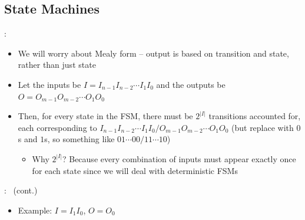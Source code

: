 \documentclass{../slides}
\begin{document}
\subsection{State Machines}
\begin{frame}{\secname: \subsecname}
    \begin{itemize}
        \item We will worry about Mealy form -- output is based on transition and state, rather than just state
        \item Let the inputs be $I = I_{n-1}I_{n-2}\cdots I_1I_0$ and the outputs be $O = O_{m-1}O_{m-2}\cdots O_1O_0$
        \item Then, for every state in the FSM, there must be $2^{|I|}$ transitions accounted for, each corresponding to $I_{n-1}I_{n-2}\cdots I_1I_0 / O_{m-1}O_{m-2}\cdots O_1O_0$ (but replace with $0$s and $1$s, so something like $01\cdots 00 / 11\cdots 10$)
        \begin{itemize}
            \item Why $2^{|I|}$? Because every combination of inputs must appear exactly once for each state since we will deal with deterministic FSMs
        \end{itemize}
    \end{itemize}
\end{frame}

\begin{frame}{\secname: \subsecname\ (cont.)}
    \begin{itemize}
        \item Example: $I = I_1I_0$, $O = O_0$
        \begin{figure}[H]
            \centering
        \end{figure}
    \end{itemize}
\end{frame}
\end{document}
